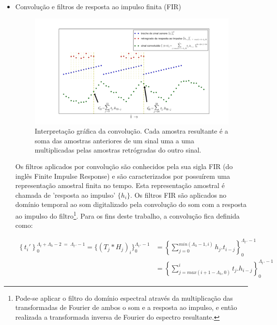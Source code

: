 \begin{itemize}

\item  Convolução e filtros de resposta ao impulso finita (FIR)

\begin{figure}[h!]
    \centering
        \includegraphics[width=\textwidth]{figuras/convolucao______}
    \caption{Interpretação gráfica da convolução. Cada amostra resultante é a soma das amostras anteriores de um sinal uma a uma multiplicadas pelas amostras retrógradas do outro sinal.}
        \label{fig:conv}
\end{figure}

Os filtros aplicados por convolução são conhecidos
pela sua sigla FIR (do inglês Finite Impulse Response)
e são caracterizados por possuírem uma representação amostral
finita no tempo. Esta representação amostral é chamada
de 'resposta ao impulso' $\{h_i\}$. Os filtros FIR são aplicados 
no domínio temporal ao som
digitalizado pela convolução do som com a 
resposta ao impulso do filtro\footnote{Pode-se aplicar o filtro do domínio espectral através da multiplicação das transformadas de Fourier de ambos o som e a resposta ao impulso, e então realizada a transformada inversa de Fourier do espectro resultante.\cite{Openheim}}. Para os fins deste trabalho, a
convolução fica definida como:

\begin{equation}\label{eq:conv}
\begin{split}
\left\{t_i'\right\}_0^{\Lambda_t+\Lambda_h-2\; = \;\Lambda_{t\, '}-1} =\{(T_j*H_j)_i\}_0^{\Lambda_{t \, '}-1} & =\left \{ \sum_{j=0}^{min(\Lambda_h-1,i)}h_{j} . t_{i-j} \right \}_0^{\Lambda_{t\, '}-1} \\
    & =\left \{ \sum_{j=max(i+1-\Lambda_h,0)}^{i}t_j . h_{i-j} \right \}_0^{\Lambda_{t\, '}-1}
\end{split}
\end{equation}


\end{itemize}
